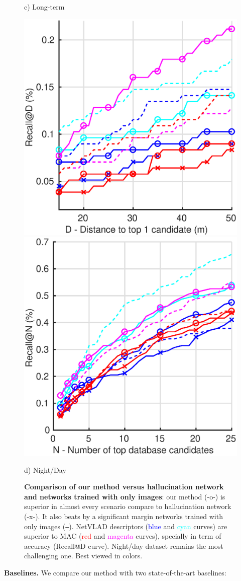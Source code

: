 \begin{figure}
\begin{minipage}{0.85\linewidth}
\begin{minipage}{0.49\linewidth}
		{\scriptsize c) Long-term}		
	\end{minipage}
	\begin{minipage}{0.49\linewidth}
		\center	
		\includegraphics[width=0.49\linewidth]{plot/fig/night_distance}	
		\includegraphics[width=0.49\linewidth]{plot/fig/night_recall}
	
		{\scriptsize d) Night/Day}
	\end{minipage}
	
	\end{minipage}

	\caption{\label{fig:results} \textbf{Comparison of our method versus hallucination network and networks trained with only images}: our method (-o-) is superior in almost every scenario compare to hallucination network (-x-). It also beats by a significant margin networks trained with only images (\texttt{--}). NetVLAD descriptors (\textcolor{blue}{blue} and \textcolor{cyan}{cyan} curves) are superior to MAC (\textcolor{red}{red} and \textcolor{magenta}{magenta} curves), specially in term of accuracy (Recall@D curve). Night/day dataset remains the most challenging one. Best viewed in colors.}
\end{figure}

\noindent\textbf{Baselines.} We compare our method with two state-of-the-art baselines:
